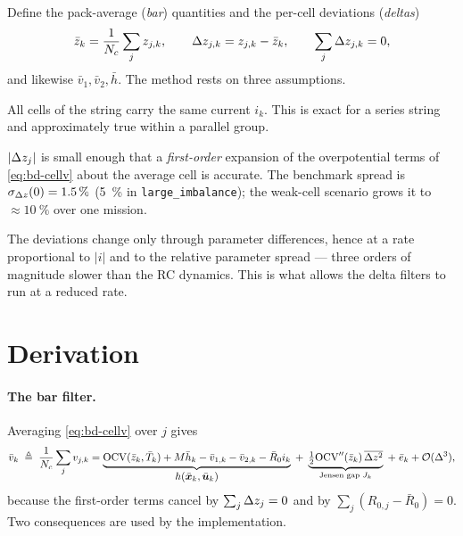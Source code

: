 Define the pack-average (\emph{bar}) quantities and the per-cell deviations (\emph{deltas})
\begin{equation}
\bar{z}_k = \frac{1}{N_c}\sum_{j} z_{j,k},\qquad
\Delta z_{j,k} = z_{j,k} - \bar{z}_k, \qquad \sum_j \Delta z_{j,k} = 0,
\label{eq:bd-decomp}
\end{equation}
and likewise $\bar v_1,\bar v_2,\bar h$. The method rests on three assumptions.

\begin{assumption}\label{as:bd-current}
All cells of the string carry the same current $i_k$. This is exact for a series string and
approximately true within a parallel group.
\end{assumption}
\begin{assumption}\label{as:bd-small}
$|\Delta z_j|$ is small enough that a \emph{first-order} expansion of the overpotential terms
of \eqref{eq:bd-cellv} about the average cell is accurate. The benchmark spread is
$\sigma_{\Delta z}(0)=\SI{1.5}{\percent}$ (\SI{5}{\percent} in \texttt{large\_imbalance}); the
weak-cell scenario grows it to $\approx\SI{10}{\percent}$ over one mission.
\end{assumption}
\begin{assumption}\label{as:bd-slow}
The deviations change only through parameter differences, hence at a rate proportional to $|i|$
and to the relative parameter spread --- three orders of magnitude slower than the RC dynamics.
This is what allows the delta filters to run at a reduced rate.
\end{assumption}

\section{Derivation}

\paragraph{The bar filter.} Averaging \eqref{eq:bd-cellv} over $j$ gives
\begin{equation}
\bar v_k \;\triangleq\; \frac{1}{N_c}\sum_j v_{j,k}
 = \underbrace{\mathrm{OCV}(\bar{z}_k,\bar T_k) + M\bar h_k - \bar v_{1,k} - \bar v_{2,k} - \bar R_0 i_k}_{\displaystyle h(\bar{\bm{x}}_k,\bar{\bm{u}}_k)}
 \;+\; \underbrace{\tfrac12 \mathrm{OCV}''(\bar{z}_k)\,\overline{\Delta z^2}}_{\text{Jensen gap } J_k}
 \;+\; \bar e_k + \mathcal{O}(\Delta^3),
\label{eq:bd-baraverage}
\end{equation}
because the first-order terms cancel by $\sum_j\Delta z_j=0$ and by
$\sum_j (R_{0,j}-\bar R_0)=0$. Two consequences are used by the implementation.

